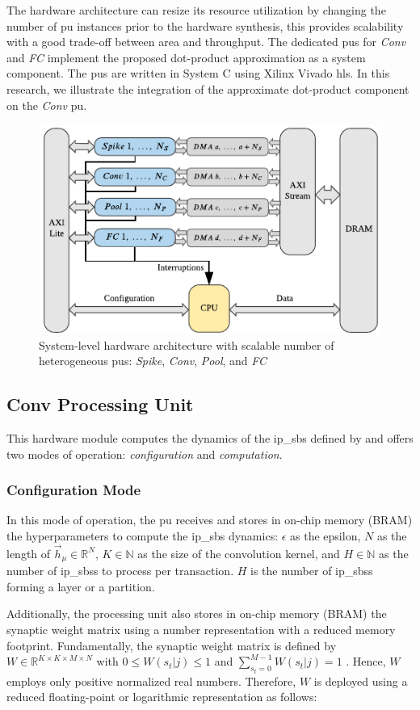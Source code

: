 The hardware architecture can resize its resource utilization by changing the number of \gls{pu} instances prior to the hardware synthesis, this provides scalability with a good trade-off between area and throughput. The dedicated \glspl{pu} for \emph{Conv} and \emph{FC} implement the proposed dot-product approximation as a system component. The \glspl{pu} are written in System C using Xilinx Vivado \gls{hls}. In this research, we illustrate the integration of the approximate dot-product component on the \emph{Conv} \gls{pu}.

\begin{figure}[b!]
	\centering
	\includegraphics[width=0.5\columnwidth]{./chapters/sbs_accelerator/figures/sbs_hw.pdf}
	\caption{System-level hardware architecture with scalable number of heterogeneous \glspl{pu}: \emph{Spike}, \emph{Conv}, \emph{Pool}, and \emph{FC}}
	\label{fig:hw_sbs}
\end{figure}

\subsection{Conv Processing Unit}
This hardware module computes the dynamics of the \gls{ip_sbs} defined by  and offers two modes of operation: \emph{configuration} and \emph{computation}.

\subsubsection{Configuration Mode}
In this mode of operation, the \gls{pu} receives and stores in on-chip memory (BRAM) the hyperparameters to compute the \gls{ip_sbs} dynamics: $\epsilon$ as the epsilon, $N$ as the length of $\vec{h}_\mu\in\mathbb{R}^{N}$, $K\in\mathbb{N}$ as the size of the convolution kernel, and $H\in\mathbb{N}$ as the number of \glspl{ip_sbs} to process per transaction. $H$ is the number of \glspl{ip_sbs} forming a layer or a partition.

Additionally, the processing unit also stores in on-chip memory (BRAM) the synaptic weight matrix using a number representation with a reduced memory footprint. Fundamentally, the synaptic weight matrix is defined by $W\in\mathbb{R}^{K\times K\times M\times N}$ with $0\le W(s_t|j)\le1$ and $\sum_{s_t=0}^{M-1}W(s_t|j)=1$ \cite{rotermund2019Backpropagation}. Hence, $W$ employs only positive normalized real numbers. Therefore, $W$ is deployed using a reduced floating-point or logarithmic representation as follows:

